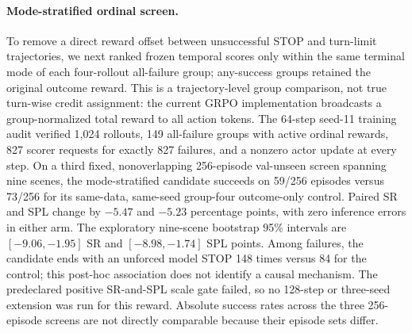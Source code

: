 \documentclass[10pt,twocolumn,letterpaper]{article}
\begin{document}
\paragraph{Mode-stratified ordinal screen.} To remove a direct reward
offset between unsuccessful STOP and turn-limit trajectories, we next
ranked frozen temporal scores only within the same terminal mode of each
four-rollout all-failure group; any-success groups retained the original
outcome reward. This is a trajectory-level group comparison, not true
turn-wise credit assignment: the current GRPO implementation broadcasts a
group-normalized total reward to all action tokens. The 64-step seed-11
training audit verified 1,024 rollouts, 149 all-failure groups with active
ordinal rewards, 827 scorer requests for exactly 827 failures, and a
nonzero actor update at every step. On a third fixed, nonoverlapping
256-episode val-unseen screen spanning nine scenes, the mode-stratified
candidate succeeds on 59/256 episodes versus 73/256 for its same-data,
same-seed group-four outcome-only control. Paired SR and SPL change by
$-5.47$ and $-5.23$ percentage points, with zero inference errors in
either arm. The exploratory nine-scene bootstrap 95\% intervals are
$[-9.06,-1.95]$ SR and $[-8.98,-1.74]$ SPL points. Among failures, the
candidate ends with an unforced model STOP 148 times versus 84 for the
control; this post-hoc association does not identify a causal mechanism.
The predeclared positive SR-and-SPL scale gate failed, so no 128-step or
three-seed extension was run for this reward. Absolute success rates
across the three 256-episode screens are not directly comparable because
their episode sets differ.
\end{document}
